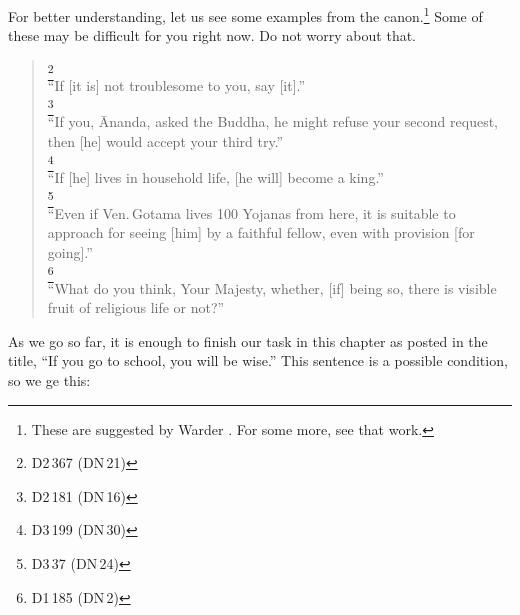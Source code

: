 
For better understanding, let us see some examples from the canon.\footnote{These are suggested by Warder \citep[pp.~294--5]{warder:intro}. For some more, see that work.} Some of these may be difficult for you right now. Do not worry about that.

\begin{quote}
\footnote{D2\,367 (DN\,21)}\\
``If [it is] not troublesome to you, say [it].''\\[1.5mm]
\footnote{D2\,181 (DN\,16)}\\
``If you, \=Ananda, asked the Buddha, he might refuse your second request, then [he] would accept your third try.''\\[1.5mm]
\footnote{D3\,199 (DN\,30)}\\
``If [he] lives in household life, [he will] become a king.''\\[1.5mm]
\footnote{D3\,37 (DN\,24)}\\
``Even if Ven.\,Gotama lives 100 Yojanas from here, it is suitable to approach for seeing [him] by a faithful fellow, even with provision [for going].''\\[1.5mm]
\footnote{D1\,185 (DN\,2)}\\
``What do you think, Your Majesty, whether, [if] being so, there is visible fruit of religious life or not?''\\[1.5mm]
\end{quote}

As we go so far, it is enough to finish our task in this chapter as posted in the title, ``If you go to school, you will be wise.'' This sentence is a possible condition, so we ge this:

